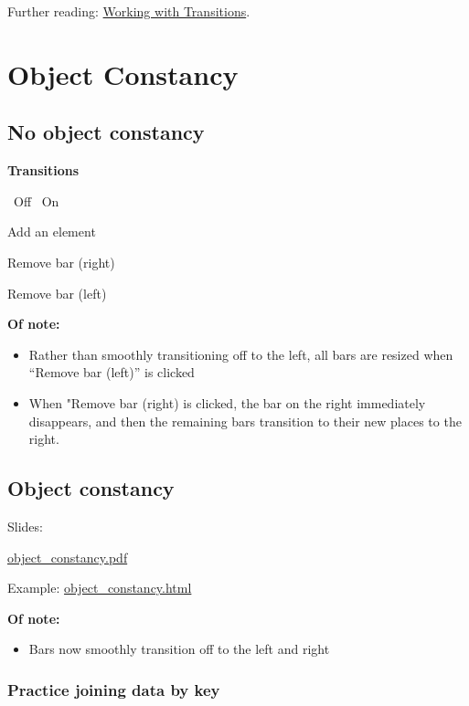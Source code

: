 \documentclass[openany]{book}
\providecommand{\tightlist}{%
  \setlength{\itemsep}{0pt}\setlength{\parskip}{0pt}}
\begin{document}
Further reading: \href{https://bost.ocks.org/mike/transition/}{Working with Transitions}.

\hypertarget{object}{%
\chapter{Object Constancy }\label{object}}

\hypertarget{no-object-constancy}{%
\section{No object constancy}\label{no-object-constancy}}

\hypertarget{chart}{}

\textbf{Transitions}

~Off
~On

Add an element

Remove bar (right)

Remove bar (left)

\textbf{Of note:}

\begin{itemize}
\item
  Rather than smoothly transitioning off to the left, all bars are resized when ``Remove bar (left)'' is clicked
\item
  When "Remove bar (right) is clicked, the bar on the right immediately disappears, and then the remaining bars transition to their new places to the right.
\end{itemize}

\hypertarget{object-constancy}{%
\section{Object constancy}\label{object-constancy}}

Slides:

\href{pdfs/object_constancy.pdf}{object\_constancy.pdf}

Example: \href{code/object_constancy.html}{object\_constancy.html}

\textbf{Of note:}

\begin{itemize}
\tightlist
\item
  Bars now smoothly transition off to the left and right
\end{itemize}

\hypertarget{practice-joining-data-by-key}{%
\subsection{Practice joining data by key}\label{practice-joining-data-by-key}}
\end{document}
